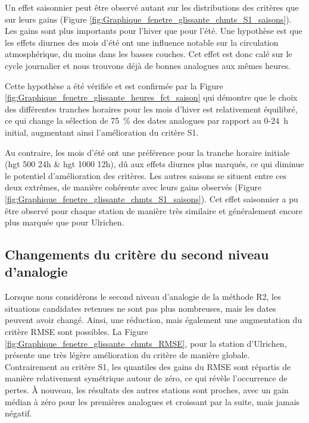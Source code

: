 \documentclass[hess]{copernicus}
\begin{document}
Un effet saisonnier peut être observé autant sur les distributions des critères que sur leurs gains (Figure \ref{fig:Graphique_fenetre_glissante_chmts_S1_saisons}). Les gains sont plus importants pour l'hiver que pour l'été. Une hypothèse est que les effets diurnes des mois d'été ont une influence notable sur la circulation atmosphérique, du moins dans les basses couches. Cet effet est donc calé sur le cycle journalier et nous trouvons déjà de bonnes analogues aux mêmes heures. 

Cette hypothèse a été vérifiée et est confirmée par la Figure \ref{fig:Graphique_fenetre_glissante_heures_fct_saison} qui démontre que le choix des différentes tranches horaires pour les mois d'hiver est relativement équilibré, ce qui change la sélection de 75~\% des dates analogues par rapport au 0-24~h initial, augmentant ainsi l'amélioration du critère S1. 

Au contraire, les mois d'été ont une préférence pour la tranche horaire initiale (hgt 500 24h \& hgt 1000 12h), dû aux effets diurnes plus marqués, ce qui diminue le potentiel d'amélioration des critères. Les autres saisons se situent entre ces deux extrêmes, de manière cohérente avec leurs gains observés (Figure \ref{fig:Graphique_fenetre_glissante_chmts_S1_saisons}). Cet effet saisonnier a pu être observé pour chaque station de manière très similaire et généralement encore plus marquée que pour Ulrichen.


\subsection{Changements du critère du second niveau d'analogie}

Lorsque nous considérons le second niveau d'analogie de la méthode R2, les situations candidates retenues ne sont pas plus nombreuses, mais les dates peuvent avoir changé. Ainsi, une réduction, mais également une augmentation du critère RMSE sont possibles. La Figure \ref{fig:Graphique_fenetre_glissante_chmts_RMSE}, pour la station d'Ulrichen, présente une très légère amélioration du critère de manière globale. Contrairement au critère S1, les quantiles des gains du RMSE sont répartis de manière relativement symétrique autour de zéro, ce qui révèle l'occurrence de pertes. À nouveau, les résultats des autres stations sont proches, avec un gain médian à zéro pour les premières analogues et croissant par la suite, mais jamais négatif.
\end{document}
